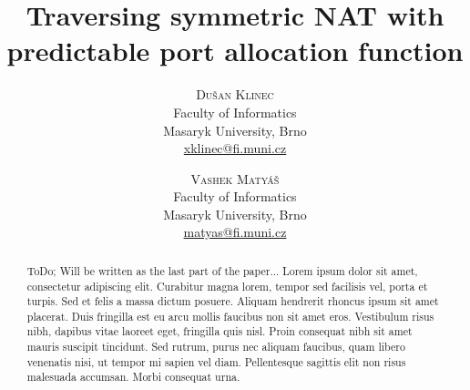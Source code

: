 \documentclass[twoside]{article}
\title{\vspace{-15mm}%
	\fontsize{24pt}{10pt}\selectfont
	\textbf{Traversing symmetric NAT with predictable port allocation function}
	}
\author{%
	\large
	\textsc{Du\v{s}an Klinec} \\[2mm]%
	\normalsize	Faculty of Informatics \\
	\normalsize	Masaryk University, Brno \\
	\normalsize	\href{mailto:xklinec@fi.muni.cz}{xklinec@fi.muni.cz}
	\and
	\textsc{Vashek Matyáš} \\[2mm]%
	\normalsize	Faculty of Informatics \\
	\normalsize	Masaryk University, Brno \\
	\normalsize	\href{mailto:matyas@fi.muni.cz}{matyas@fi.muni.cz}
	\vspace{-5mm}
	}
\date{}
\begin{document}
\maketitle
\thispagestyle{fancy}

\begin{abstract}
\noindent ToDo; Will be written as the last part of the paper... Lorem ipsum dolor sit amet, consectetur adipiscing elit. Curabitur magna lorem, tempor sed facilisis vel, porta et turpis. Sed et felis a massa dictum posuere. Aliquam hendrerit rhoncus ipsum sit amet placerat. Duis fringilla est eu arcu mollis faucibus non sit amet eros. Vestibulum risus nibh, dapibus vitae laoreet eget, fringilla quis nisl. Proin consequat nibh sit amet mauris suscipit tincidunt. Sed rutrum, purus nec aliquam faucibus, quam libero venenatis nisi, ut tempor mi sapien vel diam. Pellentesque sagittis elit non risus malesuada accumsan. Morbi consequat urna.
\end{abstract}
	
\end{document}
